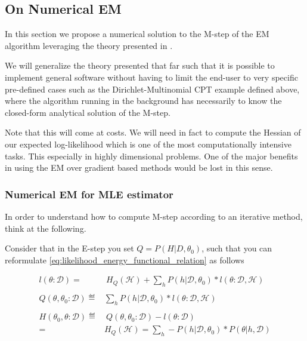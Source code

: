 \documentclass[11pt]{article}
\begin{document}
\newpage


\subsection{On Numerical EM}
\label{sec:org2d01ce3}

In this section we propose a numerical solution to the M-step of the
EM algorithm leveraging the theory presented in
\cite{ruud1989comparison}.

We will generalize the theory presented that far such that it is
possible to implement general software without having to limit the
end-user to very specific pre-defined cases such as the
Dirichlet-Multinomial CPT example defined above, where the algorithm
running in the background has necessarily to know the closed-form
analytical solution of the M-step.

Note that this will come at costs. We will need in fact to compute
the Hessian of our expected log-likelihood which is one of the most
computationally intensive tasks. This especially in highly
dimensional problems. One of the major benefits in using the EM over
gradient based methods would be lost in this sense.

\subsubsection{Numerical EM for MLE estimator}
\label{sec:org617f879}

In order to understand how to compute M-step according to an
iterative method, think at the following.

Consider that in the E-step you set \(Q = P (H| D, \theta_0)\), such
that you can reformulate
\ref{eq:likelihood_energy_functional_relation} as follows

\begin{align} \label{eq:likelihood_energy_iterative}
l (\theta: \mathscr{D}) =& \ H_Q (\mathscr {H}) + \sum_h P(h | \mathscr{D}, \theta_0) * l (\theta: \mathscr{D}, \mathscr{H}) \\
\nonumber\\
Q(\theta, \theta_0 : \mathscr{D}) \eqdef& \sum_h P(h | \mathscr{D}, \theta_0) * l (\theta: \mathscr{D}, \mathscr{H})\\
\nonumber\\  
H(\theta_0, \theta: \mathscr{D}) \eqdef& \ Q(\theta, \theta_0 : \mathscr{D}) - l (\theta: \mathscr{D}) \\
                                 =& H_Q (\mathscr {H}) = \sum_h - P(h | \mathscr{D}, \theta_0) * P(\theta | h, \mathscr{D}) \nonumber
\end{align}
\end{document}
